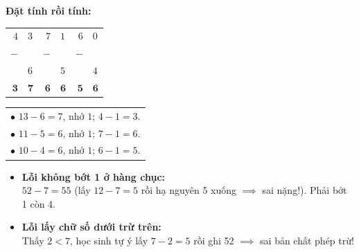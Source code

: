 \documentclass[11pt,a4paper]{article}
\begin{document}
\vspace{-1.5mm}
\noindent
\begin{minipage}[t]{0.49\textwidth}\vspace{0pt}
\begin{tcolorbox}[
  enhanced,
  colback=green!4!white,
  colframe=green!60!black,
  arc=2mm, boxrule=0.8pt,
  left=2mm, right=2mm, top=1.8mm, bottom=1.8mm,
  title={\footnotesize\bfseries\color{white}\faCheckCircle\ 4. Ví dụ thực hành chuẩn mực}
]
{\footnotesize
\textbf{Đặt tính rồi tính:}\\
\begin{tabular}{r@{\,}lr@{\,}lr@{\,}l}
  $4$ & $3$ & $7$ & $1$ & $6$ & $0$ \\
$-$ & & $-$ & & $-$ & \\
    & $6$ & & $5$ & & $4$ \\ \hline
  $\mathbf{3}$ & $\mathbf{7}$ & $\mathbf{6}$ & $\mathbf{6}$ & $\mathbf{5}$ & $\mathbf{6}$
\end{tabular}
\quad
\begin{tabular}{l}
  $\bullet$ $13 - 6 = 7$, nhớ $1$; $4 - 1 = 3$.\\
  $\bullet$ $11 - 5 = 6$, nhớ $1$; $7 - 1 = 6$.\\
  $\bullet$ $10 - 4 = 6$, nhớ $1$; $6 - 1 = 5$.
\end{tabular}
}
\end{tcolorbox}
\end{minipage}
\hfill
\begin{minipage}[t]{0.49\textwidth}\vspace{0pt}
\begin{tcolorbox}[
  enhanced,
  colback=red!4!white,
  colframe=red!75!black,
  arc=2mm, boxrule=0.8pt,
  left=2mm, right=2mm, top=1.8mm, bottom=1.8mm,
  title={\footnotesize\bfseries\color{white}\faExclamationTriangle\ 5. Mẹo tránh bẫy trắc nghiệm}
]
{\footnotesize
\begin{itemize}\setlength{\itemsep}{1pt}\setlength{\leftskip}{-2.5mm}
  \item \textbf{Lỗi không bớt 1 ở hàng chục:}\\
  $52 - 7 = 55$ (lấy $12 - 7 = 5$ rồi hạ nguyên 5 xuống $\implies$ sai nặng!). Phải bớt 1 còn 4.
  \item \textbf{Lỗi lấy chữ số dưới trừ trên:}\\
  Thấy $2 < 7$, học sinh tự ý lấy $7 - 2 = 5$ rồi ghi 52 $\implies$ sai bản chất phép trừ!
\end{itemize}
}
\end{tcolorbox}
\end{minipage}
\end{document}
